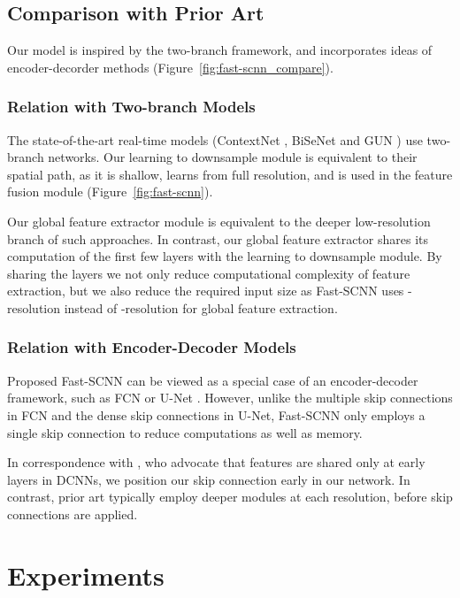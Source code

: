 \documentclass[10pt,twocolumn,letterpaper]{article}
\begin{document}
\subsection{Comparison with Prior Art}
Our model is inspired by the two-branch framework, and incorporates ideas of encoder-decorder methods (Figure~\ref{fig:fast-scnn_compare}).

\subsubsection{Relation with Two-branch Models}
The state-of-the-art real-time models (ContextNet \cite{contextnet-poudel2018}, BiSeNet \cite{BiSeNet-yu2018} and GUN \cite{gun-mazzini2018}) use two-branch networks. Our learning to downsample module is equivalent to their spatial path, as it is shallow, learns from full resolution, and is used in the feature fusion module (Figure~\ref{fig:fast-scnn}).

Our global feature extractor module is equivalent to the deeper low-resolution branch of such approaches. In contrast, our global feature extractor shares its computation of the first few layers with the learning to downsample module. By sharing the layers we not only reduce computational complexity of feature extraction, but we also reduce the required input size as Fast-SCNN uses -resolution instead of -resolution for global feature extraction.

\subsubsection{Relation with Encoder-Decoder Models}
Proposed Fast-SCNN can be viewed as a special case of an encoder-decoder framework, such as FCN \cite{fcn-long2016} or U-Net \cite{u-net-ronneberger2015}. However, unlike the multiple skip connections in FCN and the dense skip connections in U-Net, Fast-SCNN only employs a single skip connection to reduce computations as well as memory.

In correspondence with \cite{deconv-zeiler2014}, who advocate that features are shared only at early layers in DCNNs, we position our skip connection early in our network. In contrast, prior art typically employ deeper modules at each resolution, before skip connections are applied. 


\section{Experiments}
\label{sec:experiments}
\end{document}
